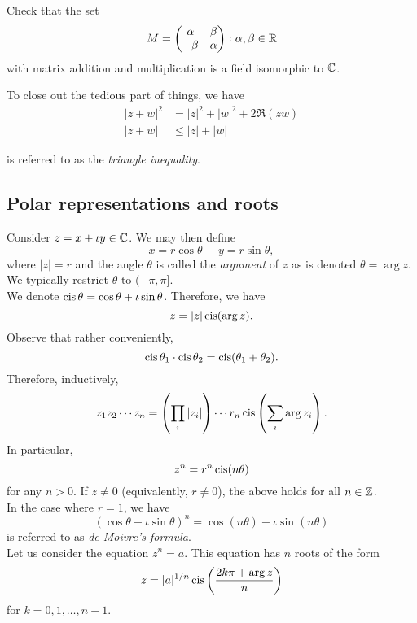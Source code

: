 	\begin{exercise}
		Check that the set
		\[ M = \begin{pmatrix} \alpha & \beta \\ -\beta & \alpha \end{pmatrix} : \alpha,\beta\in\mathbb{R} \]
		with matrix addition and multiplication is a field isomorphic to $\mathbb{C}$.
	\end{exercise}

	To close out the tedious part of things, we have
	\begin{align}
		|z+w|^2 &= |z|^2 + |w|^2 + 2 \Re(z\overline{w}) \nonumber \\
		|z+w| &\le |z| + |w| \label{eqn: triangle inequality}
	\end{align}

	 is referred to as the \emph{triangle inequality}.

\subsection{Polar representations and roots}

	Consider $z = x + \iota y \in \mathbb{C}$. We may then define
	\[ x = r\cos\theta \;\;\;\;\; y = r\sin\theta, \]
	where $|z| = r$ and the angle $\theta$ is called the \emph{argument} of $z$ as is denoted $\theta = \arg z$. We typically restrict $\theta$ to $(-\pi,\pi]$.\\
	We denote $\operatorname{cis}\theta = \cos\theta + \iota\sin\theta$. Therefore, we have
	\[ z = |z| \operatorname{cis}(\arg z). \]
	Observe that rather conveniently,
	\[ \operatorname{cis}\theta_1 \cdot \operatorname{cis}\theta_2 = \operatorname{cis}(\theta_1 + \theta_2). \]
	Therefore, inductively,
	\[ z_1 z_2 \cdots z_n = \left(\prod_{i} |z_i|\right) \cdots r_n \operatorname{cis}\left(\sum_i \arg z_i \right). \]
	In particular,
	\[ z^n = r^n \operatorname{cis}(n\theta) \]
	for any $n > 0$. If $z \ne 0$ (equivalently, $r\ne0$), the above holds for all $n \in \mathbb{Z}$.\\
	In the case where $r=1$, we have
	\begin{equation}
		\label{eqn: de moivre's}
		(\cos\theta + \iota\sin\theta)^n = \cos(n\theta) + \iota\sin(n\theta)
	\end{equation}
	 is referred to as \emph{de Moivre's formula}.\\

	Let us consider the equation $z^n = a$. This equation has $n$ roots of the form
	\[ z = |a|^{1/n} \operatorname{cis}\left( \frac{2k\pi + \arg z}{n} \right) \]
	for $k = 0,1,\ldots,n-1$.

